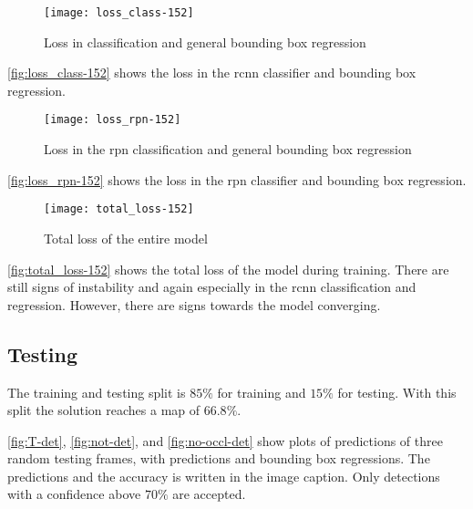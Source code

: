 \begin{figure}[H]
	\centering
	\texttt{[image: loss\_class-152]}
	\caption{Loss in classification and general bounding box regression}
	\label{fig:loss_class-152}
\end{figure}
\autoref{fig:loss_class-152} shows the loss in the \gls{rcnn} classifier and bounding box regression.

\begin{figure}[H]
	\centering
	\texttt{[image: loss\_rpn-152]}
	\caption{Loss in the \gls{rpn} classification and general bounding box regression}
	\label{fig:loss_rpn-152}
\end{figure}
\autoref{fig:loss_rpn-152} shows the loss in the \gls{rpn} classifier and bounding box regression.

\begin{figure}[H]
	\centering
	\texttt{[image: total\_loss-152]}
	\caption{Total loss of the entire model}
	\label{fig:total_loss-152}
\end{figure}
\autoref{fig:total_loss-152} shows the total loss of the model during training. There are still signs of instability and again especially in the \gls{rcnn} classification and regression. However, there are signs towards the model converging.

\subsection{Testing}
The training and testing split is $85\%$ for training and $15\%$ for testing. With this split the solution reaches a \gls{map} of $66.8\%$.

\autoref{fig:T-det}, \ref{fig:not-det}, and \ref{fig:no-occl-det} show plots of predictions of three random testing frames, with predictions and bounding box regressions. The predictions and the accuracy is written in the image caption. Only detections with a confidence above $70\%$ are accepted.\\

